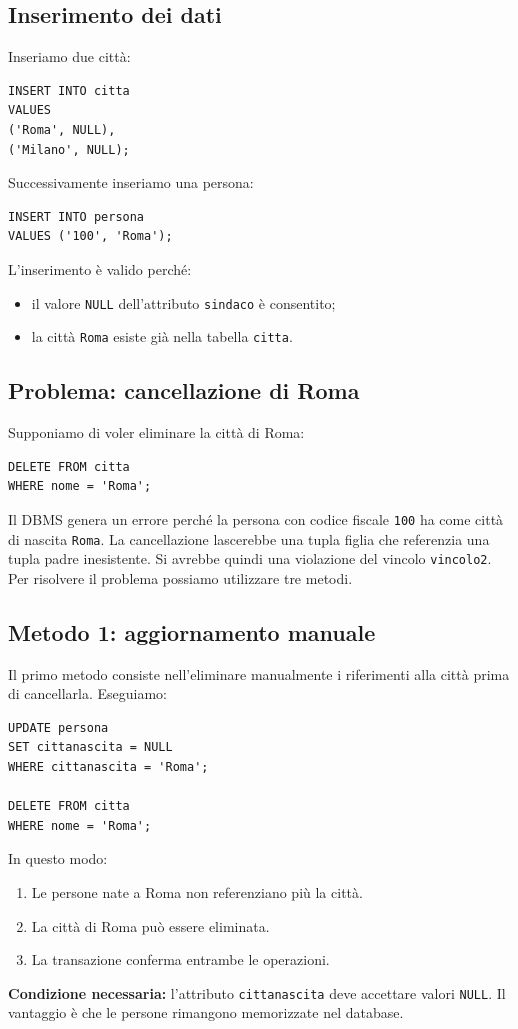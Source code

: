 \subsection{Inserimento dei dati}
Inseriamo due città:
\begin{verbatim}
INSERT INTO citta
VALUES
('Roma', NULL),
('Milano', NULL);
\end{verbatim}
Successivamente inseriamo una persona:
\begin{verbatim}
INSERT INTO persona
VALUES ('100', 'Roma');
\end{verbatim}
L'inserimento è valido perché:
\begin{itemize}
    \item il valore \texttt{NULL}
    dell'attributo \texttt{sindaco}
    è consentito;

    \item la città \texttt{Roma}
    esiste già nella tabella
    \texttt{citta}.
\end{itemize}

\subsection{Problema: cancellazione di Roma}
Supponiamo di voler eliminare
la città di Roma:
\begin{verbatim}
DELETE FROM citta
WHERE nome = 'Roma';
\end{verbatim}
Il DBMS genera un errore perché
la persona con codice fiscale
\texttt{100} ha come città
di nascita \texttt{Roma}.
La cancellazione lascerebbe
una tupla figlia che referenzia
una tupla padre inesistente.
Si avrebbe quindi una violazione
del vincolo \texttt{vincolo2}.
Per risolvere il problema
possiamo utilizzare tre metodi.

\subsection{Metodo 1: aggiornamento manuale}
Il primo metodo consiste
nell'eliminare manualmente
i riferimenti alla città
prima di cancellarla.
Eseguiamo:
\begin{verbatim}
UPDATE persona
SET cittanascita = NULL
WHERE cittanascita = 'Roma';

DELETE FROM citta
WHERE nome = 'Roma';

\end{verbatim}
In questo modo:
\begin{enumerate}
    \item Le persone nate a Roma
    non referenziano più la città.

    \item La città di Roma
    può essere eliminata.

    \item La transazione conferma
    entrambe le operazioni.
\end{enumerate}
\noindent
\textbf{Condizione necessaria:}
l'attributo \texttt{cittanascita}
deve accettare valori \texttt{NULL}.
Il vantaggio è che le persone
rimangono memorizzate nel database.
